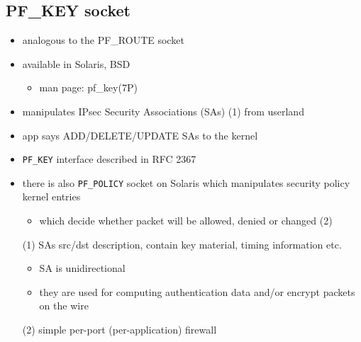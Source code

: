 
\subsection{PF\_KEY socket}

\begin{itemize}
  \item analogous to the PF\_ROUTE socket
  \item available in Solaris, BSD
    \begin{itemize}
      \item man page: pf\_key(7P)
    \end{itemize}
  \item manipulates IPsec Security Associations (SAs) (1) from userland
  \item app says ADD/DELETE/UPDATE SAs to the kernel
  \item \texttt{PF\_KEY} interface described in RFC 2367
  \item there is also \texttt{PF\_POLICY} socket on Solaris which manipulates
    security policy kernel entries
    \begin{itemize}
      \item which decide whether packet will be allowed, denied or changed (2)
    \end{itemize}
\end{itemize}


\begin{itemize}
  \item[(1)] SAs src/dst description, contain key material, timing information
    etc.
    \begin{itemize}
      \item SA is unidirectional
      \item they are used for computing authentication data and/or encrypt
        packets on the wire
    \end{itemize}
  \item[(2)] simple per-port (per-application) firewall
\end{itemize}

